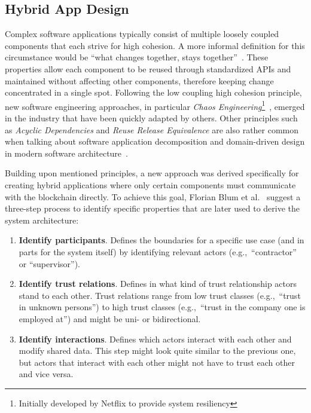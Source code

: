 \subsection{Hybrid App Design}
Complex software applications typically consist of multiple loosely coupled components that each strive for high cohesion. A more informal definition for this circumstance would be ``what changes together, stays together''~\cite{newman2019_monolith_to_microservices_constantines_law}. These properties allow each component to be reused through standardized APIs and maintained without affecting other components, therefore keeping change concentrated in a single spot. Following the low coupling high cohesion principle, new software engineering approaches, in particular \textit{Chaos Engineering}\footnote{Initially developed by Netflix to provide system resiliency}~\cite{chaos_engineering}, emerged in the industry that have been quickly adapted by others. Other principles such as \textit{Acyclic Dependencies} and \textit{Reuse Release Equivalence} are also rather common when talking about software application decomposition and domain-driven design in modern software architecture~\cite{clean_architecture}.

Building upon mentioned principles, a new approach was derived specifically for creating hybrid applications where only certain components must communicate with the blockchain directly. To achieve this goal, Florian Blum et al.~\cite{how_much_blockchain_do_you_need} suggest a three-step process to identify specific properties that are later used to derive the system architecture:

\begin{enumerate}
  \item \textbf{Identify participants}. Defines the boundaries for a specific use case (and in parts for the system itself) by identifying relevant actors (e.g.,\ ``contractor'' or ``supervisor'').
  \item \textbf{Identify trust relations}. Defines in what kind of trust relationship actors stand to each other. Trust relations range from low trust classes (e.g.,\ ``trust in unknown persons'') to high trust classes (e.g.,\ ``trust in the company one is employed at'') and might be uni- or bidirectional.
  \item \textbf{Identify interactions}. Defines which actors interact with each other and modify shared data. This step might look quite similar to the previous one, but actors that interact with each other might not have to trust each other and vice versa.
\end{enumerate}

